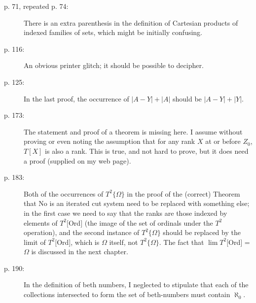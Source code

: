 \documentclass{article}
\begin{document}
\begin{description}
\item[p. 71, repeated p. 74:] There is an extra parenthesis in the definition
of Cartesian products of indexed families of sets, which might be
initially confusing.

\item[p. 116:] An obvious printer glitch; it should be possible to decipher.

\item[p. 125:] In the last proof, the occurrence of $|A-Y|+|A|$ should be
$|A-Y|+|Y|$.

\item[p. 173:] The statement and proof of a theorem is missing here.  I
assume without proving or even noting the assumption that for any rank
$X$ at or before $Z_0$, $T[X]$ is also a rank.  This is true, and not hard
to prove, but it does need a proof (supplied on my web page).

\item[p. 183:] Both of the occurrences of $T^2\{\Omega\}$ in the proof of the
(correct) Theorem that No is an iterated cut system need to be
replaced with something else; in the first case we need to say that
the ranks are those indexed by elements of $T^2[$Ord$]$ (the image of the
set of ordinals under the $T^2$ operation), and the second instance of
$T^2\{\Omega\}$ should be replaced by the limit of $T^2[$Ord$]$, which is $\Omega$
itself, not $T^2\{\Omega\}$.  The fact that $\lim T^2[$Ord$]$ = $\Omega$ is
discussed in the next chapter.

\item[p. 190:] In the definition of beth numbers, I neglected to stipulate
that each of the collections intersected to form the set of
beth-numbers must contain $\aleph_0$.

\end{description}
\end{document}
